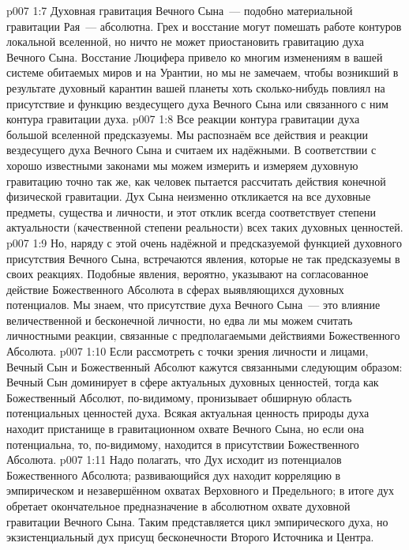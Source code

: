 \vs p007 1:7 \pc Духовная гравитация Вечного Сына~--- подобно материальной гравитации Рая~--- абсолютна. Грех и восстание могут помешать работе контуров локальной вселенной, но ничто не может приостановить гравитацию духа Вечного Сына. Восстание Люцифера привело ко многим изменениям в вашей системе обитаемых миров и на Урантии, но мы не замечаем, чтобы возникший в результате духовный карантин вашей планеты хоть сколько\hyp{}нибудь повлиял на присутствие и функцию вездесущего духа Вечного Сына или связанного с ним контура гравитации духа.
\vs p007 1:8 \pc Все реакции контура гравитации духа большой вселенной предсказуемы. Мы распознаём все действия и реакции вездесущего духа Вечного Сына и считаем их надёжными. В соответствии с хорошо известными законами мы можем измерить и измеряем духовную гравитацию точно так же, как человек пытается рассчитать действия конечной физической гравитации. Дух Сына неизменно откликается на все духовные предметы, существа и личности, и этот отклик всегда соответствует степени актуальности (качественной степени реальности) всех таких духовных ценностей.
\vs p007 1:9 Но, наряду с этой очень надёжной и предсказуемой функцией духовного присутствия Вечного Сына, встречаются явления, которые не так предсказуемы в своих реакциях. Подобные явления, вероятно, указывают на согласованное действие Божественного Абсолюта в сферах выявляющихся духовных потенциалов. Мы знаем, что присутствие духа Вечного Сына~--- это влияние величественной и бесконечной личности, но едва ли мы можем считать личностными реакции, связанные с предполагаемыми действиями Божественного Абсолюта.
\vs p007 1:10 \pc Если рассмотреть с точки зрения личности и лицами, Вечный Сын и Божественный Абсолют кажутся связанными следующим образом: Вечный Сын доминирует в сфере актуальных духовных ценностей, тогда как Божественный Абсолют, по\hyp{}видимому, пронизывает обширную область потенциальных ценностей духа. Всякая актуальная ценность природы духа находит пристанище в гравитационном охвате Вечного Сына, но если она потенциальна, то, по\hyp{}видимому, находится в присутствии Божественного Абсолюта.
\vs p007 1:11 Надо полагать, что Дух исходит из потенциалов Божественного Абсолюта; развивающийся дух находит корреляцию в эмпирическом и незавершённом охватах Верховного и Предельного; в итоге дух обретает окончательное предназначение в абсолютном охвате духовной гравитации Вечного Сына. Таким представляется цикл эмпирического духа, но экзистенциальный дух присущ бесконечности Второго Источника и Центра.
